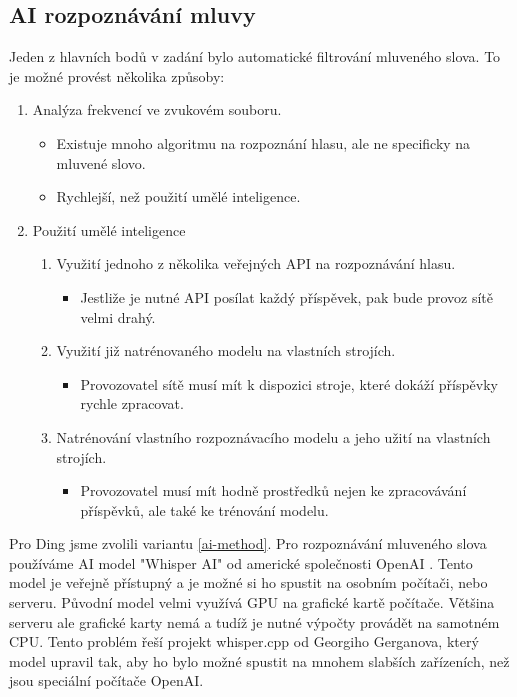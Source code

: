 \subsection{AI rozpoznávání mluvy} \label{backend-ai}

Jeden z hlavních bodů v zadání bylo automatické filtrování mluveného slova. To je možné provést
několika způsoby:

\begin{enumerate}
    \item Analýza frekvencí ve zvukovém souboru.
        \begin{itemize}
            \item Existuje mnoho algoritmu na rozpoznání hlasu, ale ne specificky na mluvené slovo.
            \item Rychlejší, než použití umělé inteligence.
        \end{itemize}
    \item Použití umělé inteligence
        \begin{enumerate}
            \item Využití jednoho z několika veřejných API na rozpoznávání hlasu.
                \begin{itemize}
                    \item Jestliže je nutné API posílat každý příspěvek, pak bude provoz sítě velmi
                        drahý.
                \end{itemize}
            \item Využití již natrénovaného modelu na vlastních strojích. \label{ai-method}
                \begin{itemize}
                    \item Provozovatel sítě musí mít k dispozici stroje, které dokáží příspěvky
                        rychle zpracovat.
                \end{itemize}
            \item Natrénování vlastního rozpoznávacího modelu a jeho užití na vlastních strojích.
                \begin{itemize}
                    \item Provozovatel musí mít hodně prostředků nejen ke zpracovávání příspěvků,
                        ale také ke trénování modelu.
                \end{itemize}
        \end{enumerate}
\end{enumerate}

Pro Ding jsme zvolili variantu \ref{ai-method}. Pro rozpoznávání mluveného slova používáme AI model
"Whisper AI" od americké společnosti OpenAI \cite{openai-whisper}. Tento model je veřejně přístupný
a je možné si ho spustit na osobním počítači, nebo serveru. Původní model velmi využívá GPU na
grafické kartě počítače. Většina serveru ale grafické karty nemá a tudíž je nutné výpočty provádět
na samotném CPU. Tento problém řeší projekt whisper.cpp od Georgiho Gerganova, který model upravil
tak, aby ho bylo možné spustit na mnohem slabších zařízeních, než jsou speciální počítače OpenAI.


